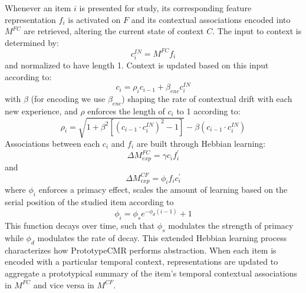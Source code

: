 {}\markdownRendererInterblockSeparator
{}Whenever an item $i$ is presented for study, its corresponding feature representation $f_i$ is activated on $F$ and its contextual associations encoded into $M^{FC}$ are retrieved, altering the current state of context $C$.\markdownRendererInterblockSeparator
{}The input to context is determined by:\markdownRendererInterblockSeparator
{}\begin{equation} \label{eq:3} c^{IN}_{i} = M^{FC}f_{i} \end{equation}\markdownRendererInterblockSeparator
{}and normalized to have length 1. Context is updated based on this input according to:\markdownRendererInterblockSeparator
{}\begin{equation} \label{eq:4} c_i = \rho_ic_{i-1} + \beta_{enc} c_{i}^{IN} \end{equation}\markdownRendererInterblockSeparator
{}with $\beta$ (for encoding we use $\beta_{enc}$) shaping the rate of contextual drift with each new experience, and $\rho$ enforces the length of $c_i$ to 1 according to:\markdownRendererInterblockSeparator
{}\begin{equation} \rho_i = \sqrt{1 + \beta^2\left[\left(c_{i-1} \cdot c^{IN}_i\right)^2 - 1\right]} - \beta\left(c_{i-1} \cdot c^{IN}_i\right) \label{eq:5} \end{equation}\markdownRendererInterblockSeparator
{}Associations between each $c_i$ and $f_i$ are built through Hebbian learning:\markdownRendererInterblockSeparator
{}\begin{equation} \label{eq:6 }\Delta M^{FC}_{exp} = \gamma c_i f^{'}_i \end{equation}\markdownRendererInterblockSeparator
{}and\markdownRendererInterblockSeparator
{}\begin{equation} \label{eq:7} \Delta M^{CF}_{exp} = \phi_i f_i c^{'}_i \end{equation}\markdownRendererInterblockSeparator
{}where $\phi_i$ enforces a primacy effect, scales the amount of learning based on the serial position of the studied item according to\markdownRendererInterblockSeparator
{}\begin{equation} \label{eq:8} \phi_i = \phi_se^{-\phi_d(i-1)} + 1 \end{equation}\markdownRendererInterblockSeparator
{}This function decays over time, such that $\phi_{s}$ modulates the strength of primacy while $\phi_{d}$ modulates the rate of decay.\markdownRendererInterblockSeparator
{}This extended Hebbian learning process characterizes how PrototypeCMR performs abstraction. When each item is encoded with a particular temporal context, representations are updated to aggregate a prototypical summary of the item's temporal contextual associations in $M^{FC}$ and vice versa in $M^{CF}$. \markdownRendererInterblockSeparator
